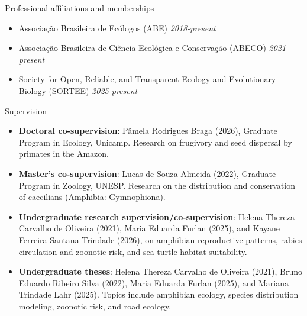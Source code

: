 \documentclass{resume}
\begin{document}
\begin{rSection}{Professional affiliations and memberships}
\begin{itemize}
\item Associação Brasileira de Ecólogos (ABE) \hfill{\em 2018-present}
\item Associação Brasileira de Ciência Ecológica e Conservação (ABECO) \hfill{\em 2021-present}
\item Society for Open, Reliable, and Transparent Ecology and Evolutionary Biology (SORTEE) \hfill{\em 2025-present}
\end{itemize}
\end{rSection}

\begin{rSection}{Supervision}
\begin{itemize}
\item \textbf{Doctoral co-supervision}: Pâmela Rodrigues Braga (2026), Graduate Program in Ecology, Unicamp. Research on frugivory and seed dispersal by primates in the Amazon.
\item \textbf{Master's co-supervision}: Lucas de Souza Almeida (2022), Graduate Program in Zoology, UNESP. Research on the distribution and conservation of caecilians (Amphibia: Gymnophiona).
\item \textbf{Undergraduate research supervision/co-supervision}: Helena Thereza Carvalho de Oliveira (2021), Maria Eduarda Furlan (2025), and Kayane Ferreira Santana Trindade (2026), on amphibian reproductive patterns, rabies circulation and zoonotic risk, and sea-turtle habitat suitability.
\item \textbf{Undergraduate theses}: Helena Thereza Carvalho de Oliveira (2021), Bruno Eduardo Ribeiro Silva (2022), Maria Eduarda Furlan (2025), and Mariana Trindade Lahr (2025). Topics include amphibian ecology, species distribution modeling, zoonotic risk, and road ecology.
\end{itemize}
\end{rSection}
\end{document}
